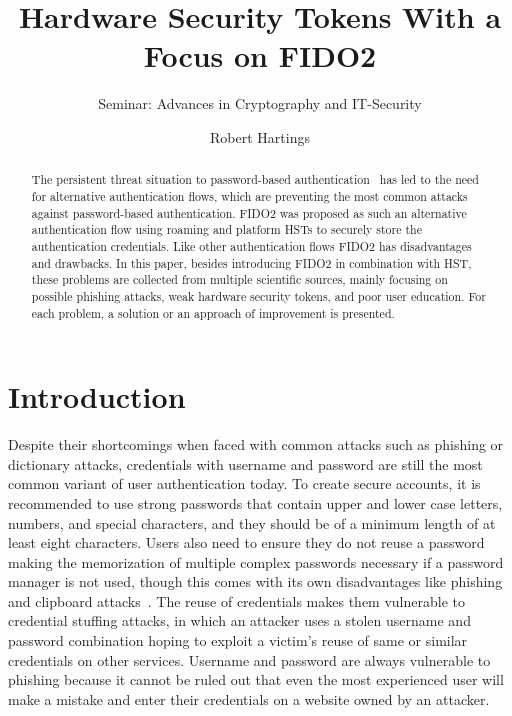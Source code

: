 \documentclass[runningheads]{llncs}
\begin{document}
%
\title{Hardware Security Tokens With a Focus on FIDO2}
\subtitle{Seminar: Advances in Cryptography and IT-Security}
%
%

\author{Robert Hartings}

%
\maketitle              %
\begin{abstract}
The persistent threat situation to password-based authentication~\cite{000006} has led to the need for alternative authentication flows, which are preventing the most common attacks against password-based authentication. FIDO2 was proposed as such an alternative authentication flow using roaming and platform HSTs to securely store the authentication credentials. Like other authentication flows FIDO2 has disadvantages and drawbacks. In this paper, besides introducing FIDO2 in combination with HST, these problems are collected from multiple scientific sources, mainly focusing on possible phishing attacks, weak hardware security tokens, and poor user education. For each problem, a solution or an approach of improvement is presented.

\end{abstract}
%
%
%
\section{Introduction}
Despite their shortcomings when faced with common attacks such as phishing or dictionary attacks, credentials with username and password are still the most common variant of user authentication today. To create secure accounts, it is recommended to use strong passwords that contain upper and lower case letters, numbers, and special characters, and they should be of a minimum length of at least eight characters. Users also need to ensure they do not reuse a password making the memorization of multiple complex passwords necessary if a password manager is not used, though this comes with its own disadvantages like phishing and clipboard attacks~\cite{8326801}. The reuse of credentials makes them vulnerable to credential stuffing attacks, in which an attacker uses a stolen username and password combination hoping to exploit a victim's reuse of same or similar credentials on other services. Username and password are always vulnerable to phishing because it cannot be ruled out that even the most experienced user will make a mistake and enter their credentials on a website owned by an attacker.
\end{document}
